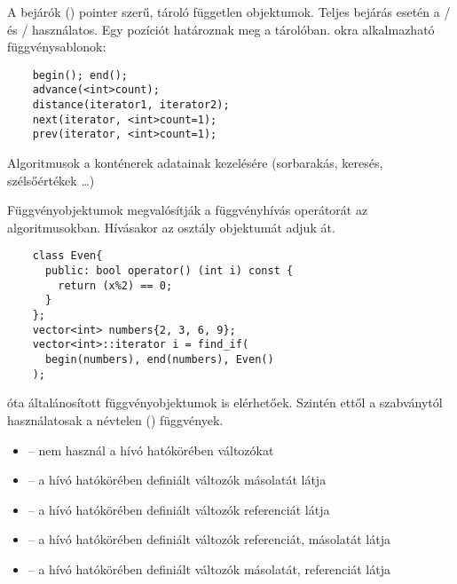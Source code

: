 \documentclass[main.tex]{subfiles}
\begin{document}
  A bejárók () pointer szerű, tároló
  független objektumok. Teljes bejárás esetén a
  / és
  / használatos.
  Egy pozíciót határoznak meg a tárolóban.
  okra alkalmazható függvénysablonok:
  \begin{lstlisting}
    begin(); end();
    advance(<int>count);
    distance(iterator1, iterator2);
    next(iterator, <int>count=1);
    prev(iterator, <int>count=1);
  \end{lstlisting}

  Algoritmusok a konténerek adatainak kezelésére
  (sorbarakás, keresés, szélsőértékek \dots)

  Függvényobjektumok megvalósítják a függvényhívás
  \kkod{()} operátorát az algoritmusokban.
  Hívásakor az osztály objektumát adjuk át.
  \begin{lstlisting}
    class Even{
      public: bool operator() (int i) const {
        return (x%2) == 0;
      }
    };
    vector<int> numbers{2, 3, 6, 9};
    vector<int>::iterator i = find_if(
      begin(numbers), end(numbers), Even()
    );
  \end{lstlisting}
   óta általánosított függvényobjektumok
  is elérhetőek. Szintén ettől a szabványtól használatosak
  a névtelen () függvények.
  \begin{itemize}
    \item \kkod{[]\{\};}        \hspace{33pt} – \hspace{8pt}
    nem használ a hívó hatókörében változókat

    \item \kkod{[=]\{\};}       \hspace{27pt} – \hspace{8pt}
    a hívó hatókörében definiált változók másolatát látja
    
    \item \kkod{[\&]\{\};}      \hspace{27pt} – \hspace{8pt}
    a hívó hatókörében definiált változók referenciát látja
    
    \item \kkod{[\&,i]\{\};}  \hspace{15.2pt} – \hspace{8pt}
    a hívó hatókörében definiált változók referenciát,
     másolatát látja
    
    \item \kkod{[=,\&{}i]\{\};}  \hspace{9pt} – \hspace{8pt}
    a hívó hatókörében definiált változók másolatát,
     referenciát látja
  \end{itemize}
\end{document}
